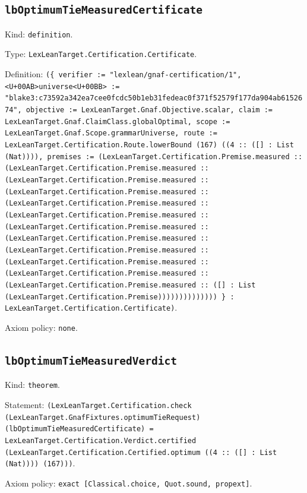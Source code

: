 \documentclass[11pt]{article}
\begin{document}
\subsection*{\texttt{lbOptimumTieMeasuredCertificate}}
\noindent Kind: \texttt{definition}.\par
\noindent Type: \texttt{LexLeanTarget.Certification.Certificate}.\par
\noindent Definition: \texttt{(\{ verifier := "lexlean/gnaf-certification/1", <U+00AB>universe<U+00BB> := "blake3:c73592a342ea7cee0fcdc50b1eb31fedeac0f371f52579f177da904ab6152674", objective := LexLeanTarget.Gnaf.Objective.scalar, claim := LexLeanTarget.Gnaf.ClaimClass.globalOptimal, scope := LexLeanTarget.Gnaf.Scope.grammarUniverse, route := LexLeanTarget.Certification.Route.lowerBound (167) ((4 :: ([] : List (Nat)))), premises := (LexLeanTarget.Certification.Premise.measured :: (LexLeanTarget.Certification.Premise.measured :: (LexLeanTarget.Certification.Premise.measured :: (LexLeanTarget.Certification.Premise.measured :: (LexLeanTarget.Certification.Premise.measured :: (LexLeanTarget.Certification.Premise.measured :: (LexLeanTarget.Certification.Premise.measured :: (LexLeanTarget.Certification.Premise.measured :: (LexLeanTarget.Certification.Premise.measured :: (LexLeanTarget.Certification.Premise.measured :: (LexLeanTarget.Certification.Premise.measured :: (LexLeanTarget.Certification.Premise.measured :: ([] : List (LexLeanTarget.Certification.Premise)))))))))))))) \} : LexLeanTarget.Certification.Certificate)}.\par
\noindent Axiom policy: \texttt{none}.\par
\subsection*{\texttt{lbOptimumTieMeasuredVerdict}}
\noindent Kind: \texttt{theorem}.\par
\noindent Statement: \texttt{(LexLeanTarget.Certification.check (LexLeanTarget.GnafFixtures.optimumTieRequest) (lbOptimumTieMeasuredCertificate) = LexLeanTarget.Certification.Verdict.certified (LexLeanTarget.Certification.Certified.optimum ((4 :: ([] : List (Nat)))) (167)))}.\par
\noindent Axiom policy: \texttt{exact [Classical.choice, Quot.sound, propext]}.\par
\end{document}

